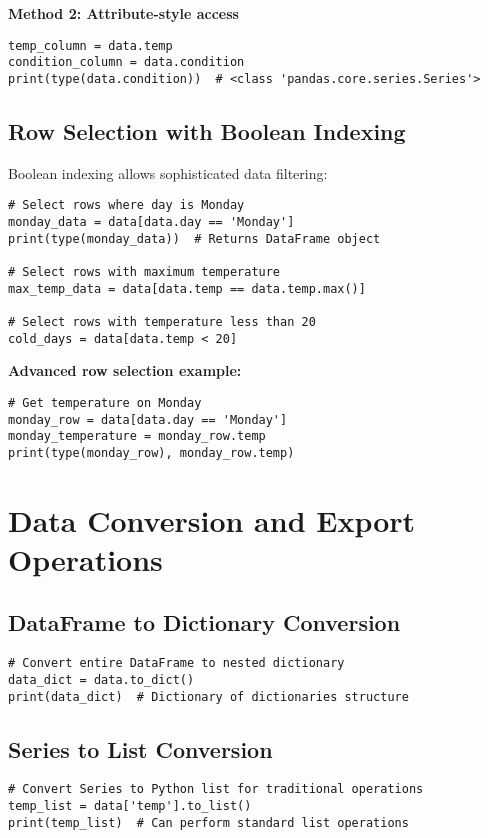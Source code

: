 \documentclass[12pt]{article}
\begin{document}
\textbf{Method 2: Attribute-style access}
\begin{lstlisting}
temp_column = data.temp
condition_column = data.condition
print(type(data.condition))  # <class 'pandas.core.series.Series'>
\end{lstlisting}

\subsection{Row Selection with Boolean Indexing}

Boolean indexing allows sophisticated data filtering:

\begin{lstlisting}
# Select rows where day is Monday
monday_data = data[data.day == 'Monday']
print(type(monday_data))  # Returns DataFrame object

# Select rows with maximum temperature
max_temp_data = data[data.temp == data.temp.max()]

# Select rows with temperature less than 20
cold_days = data[data.temp < 20]
\end{lstlisting}

\textbf{Advanced row selection example:}
\begin{lstlisting}
# Get temperature on Monday
monday_row = data[data.day == 'Monday']
monday_temperature = monday_row.temp
print(type(monday_row), monday_row.temp)
\end{lstlisting}

\section{Data Conversion and Export Operations}

\subsection{DataFrame to Dictionary Conversion}

\begin{lstlisting}
# Convert entire DataFrame to nested dictionary
data_dict = data.to_dict()
print(data_dict)  # Dictionary of dictionaries structure
\end{lstlisting}

\subsection{Series to List Conversion}

\begin{lstlisting}
# Convert Series to Python list for traditional operations
temp_list = data['temp'].to_list()
print(temp_list)  # Can perform standard list operations
\end{lstlisting}
\end{document}
